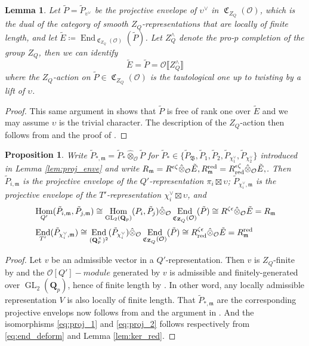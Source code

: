 \documentclass[leqno]{amsart}
\newtheorem{lem}[thm]{Lemma}
\newtheorem{prop}[thm]{Proposition}
\theoremstyle{definition}
\theoremstyle{remark}
\newcommand{\oo}{\mathcal{O}}
\newcommand{\Z}{{\mathbf{Z}}}
\newcommand{\Qp}{\mathbf{Q}_p}
\DeclareMathOperator{\End}{End}
\DeclareMathOperator{\Hom}{Hom}
\DeclareMathOperator{\GL}{GL}
\newcommand{\fm}{\mathfrak{m}}
\DeclareMathOperator{\fC}{\mathfrak{C}} %
\newcommand{\B}{\mathfrak B} %
\newcommand{\red}{\textnormal{red}}
\begin{document}
\begin{lem}\label{lem:end_comp}
Let  $\tilde{P}=\tilde{P}_{\upsilon^\vee}$
be the projective envelope of $\upsilon^\vee$
in $\fC_{Z_Q}(\oo)$,
which is the dual of the category 
of smooth $Z_Q$-representations
that are locally of finite length, and let
$\tilde{E}\coloneqq 
\End_{\fC_{Z_Q}(\oo)}(\tilde{P})$.
Let $Z_Q^\wedge$ denote the pro-$p$ completion
of the group $Z_Q$,
then we can identify
\[
    \tilde{E}=\tilde{P}
    =\oo\llbracket Z_Q^\wedge\rrbracket
\]
where the $Z_Q$-action on $\tilde{P}\in \fC_{Z_Q}(\oo)$
is the tautological one up to
twisting by a lift of $\upsilon$.
\end{lem}
\begin{proof}
This same argument in \cite[Prop. 3.34]{pask} 
shows that $\tilde{P}$
is free of rank one over $\tilde{E}$
and we may assume $\upsilon$ is the trivial character.
The description of the $Z_Q$-action
then follows from 
\cite[Cor. 3.27]{pask} and the proof of
\cite[Lem. 3.32]{pask}.
\end{proof}


\begin{prop}\label{prop:envelope}
    Write $\tilde{P}_{*,\fm}=
    \tilde{P}_*\hat{\otimes}_{\oo}\tilde{P}$
    for $\tilde{P}_*\in\{\tilde{P}_\B, \tilde{P}_1, \tilde{P}_2,
    \tilde{P}_{\chi_1^\vee}, \tilde{P}_{\chi_2^\vee}\}$
    introduced in Lemma \ref{lem:proj_enve}
	and write 
    $R_{\fm}=R^{\epsilon\zeta}
	\hat{\otimes}_{\oo}\tilde{E},
    R_{\fm}^\red=R^{\epsilon\zeta}_\red
	\hat{\otimes}_{\oo}\tilde{E},$.
	Then $\tilde{P}_{i,\fm}$
	is the projective envelope
	of the $Q'$-representation $\pi_i\boxtimes\upsilon$;
	$\tilde{P}_{\chi_i^\vee,\fm}$
	is the projective envelope
	of the $T'$-representation $\chi_i^\vee\boxtimes\upsilon$,
    and
    \begin{align}\label{eq:proj_1}
    &\Hom_{Q'}(\tilde{P}_{i,\fm}, \tilde{P}_{j,\fm}) \cong 
    \Hom_{\GL_2(\Qp)}(P_{i}, \tilde{P}_{j})
    \hat{\otimes}_\oo \End_{\fC_{\Z_Q}(\oo)}(\tilde{P})\cong 
    R^{\zeta\epsilon} \hat{\otimes}_\oo \tilde{E}
    = R_\fm\\\label{eq:proj_2}
    &\End_{T'}(\tilde{P}_{\chi_i^\vee,\fm}) \cong 
    \End_{(\Qp^\times)^2}(\tilde{P}_{\chi_i^\vee})
    \hat{\otimes}_\oo \End_{\fC_{\Z_Q}(\oo)}(\tilde{P})\cong 
    R^{\zeta\epsilon}_\red \hat{\otimes}_\oo \tilde{E}
    =R_\fm^{\red}
    \end{align}
\end{prop}
\begin{proof}
    Let $v$ be an admissible vector
    in a $Q'$-representation.
	Then $v$ is $Z_Q$-finite by \cite[Lem 2.3.5]{emeI}
	and the $\oo[Q']-module$
	generated by $v$ is admissible and
	finitely-generated over $\GL_2(\Qp)$,
	hence of finite length by \cite[Thm 2.3.8]{emeI}.
	In other word,
	any locally admissible representation $V$
	is also locally of finite length.
    That $\tilde{P}_{*,\fm}$ are
    the corresponding projective envelops now follows from 
    \cite[Lem B.6]{GN}
	and the argument in \cite[Lem B.8]{GN}.
    And the isomorphisms 
    \eqref{eq:proj_1} and
    \eqref{eq:proj_2} follows respectively from  
    \eqref{eq:end_deform} and 
    Lemma \eqref{lem:ker_red}.
\end{proof}
\end{document}
